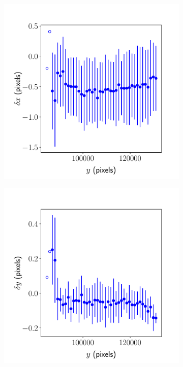 \documentclass{article}
\begin{document}
\begin{figure}[ht]
\begin{subfigure}{0.24\linewidth}
		\caption{}
		\label{fig:sinewave4yxAKY}
	\end{subfigure}
	\begin{subfigure}{0.24\linewidth}
		\includegraphics[width=\linewidth]{sine-wave-4-xy-AKY.pdf}
		\caption{}
		\label{fig:sinewave4xyAKY}
	\end{subfigure}
	\begin{subfigure}{0.24\linewidth}
		\includegraphics[width=\linewidth]{sine-wave-4-yy-AKY.pdf}

\end{subfigure}
\end{figure}
\end{document}
